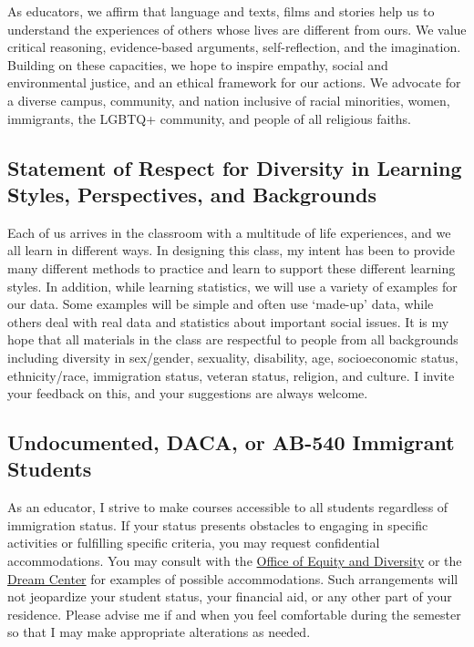 \documentclass[11pt,]{article}
\begin{document}
As educators, we affirm that language and texts, films and stories help
us to understand the experiences of others whose lives are different
from ours. We value critical reasoning, evidence-based arguments,
self-reflection, and the imagination. Building on these capacities, we
hope to inspire empathy, social and environmental justice, and an
ethical framework for our actions. We advocate for a diverse campus,
community, and nation inclusive of racial minorities, women, immigrants,
the LGBTQ+ community, and people of all religious faiths.

\hypertarget{statement-of-respect-for-diversity-in-learning-styles-perspectives-and-backgrounds}{%
\subsection{Statement of Respect for Diversity in Learning Styles,
Perspectives, and
Backgrounds}\label{statement-of-respect-for-diversity-in-learning-styles-perspectives-and-backgrounds}}

Each of us arrives in the classroom with a multitude of life
experiences, and we all learn in different ways. In designing this
class, my intent has been to provide many different methods to practice
and learn to support these different learning styles. In addition, while
learning statistics, we will use a variety of examples for our data.
Some examples will be simple and often use `made-up' data, while others
deal with real data and statistics about important social issues. It is
my hope that all materials in the class are respectful to people from
all backgrounds including diversity in sex/gender, sexuality,
disability, age, socioeconomic status, ethnicity/race, immigration
status, veteran status, religion, and culture. I invite your feedback on
this, and your suggestions are always welcome.

\hypertarget{undocumented-daca-or-ab-540-immigrant-students}{%
\subsection{Undocumented, DACA, or AB-540 Immigrant
Students}\label{undocumented-daca-or-ab-540-immigrant-students}}

As an educator, I strive to make courses accessible to all students
regardless of immigration status. If your status presents obstacles to
engaging in specific activities or fulfilling specific criteria, you may
request confidential accommodations. You may consult with the
\href{https://www.csuchico.edu/diversity/}{Office of Equity and
Diversity} or the \href{https://www.csuchico.edu/dreamcenter/}{Dream
Center} for examples of possible accommodations. Such arrangements will
not jeopardize your student status, your financial aid, or any other
part of your residence. Please advise me if and when you feel
comfortable during the semester so that I may make appropriate
alterations as needed.
\end{document}
